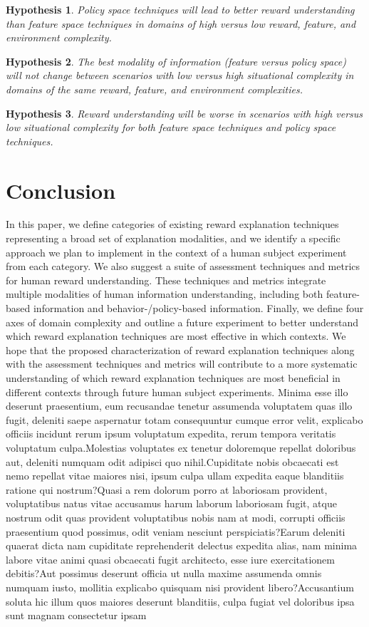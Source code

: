 \documentclass[letterpaper]{article} %
\newtheorem{hyp}{Hypothesis}
\begin{document}
\begin{hyp}
Policy space techniques will lead to better reward understanding than feature space techniques in domains of high versus low reward, feature, and environment complexity.
\end{hyp}


\begin{hyp}
The best modality of information (feature versus policy space) will not change between scenarios with low versus high situational complexity in domains of the same reward, feature, and environment complexities.
\end{hyp}

\begin{hyp}
Reward understanding will be worse in scenarios with high versus low situational complexity for both feature space techniques and policy space techniques.
\end{hyp}


\section{Conclusion}
\label{conclusion}
In this paper, we define categories of existing reward explanation techniques representing a broad set of explanation modalities, and we identify a specific approach we plan to implement in the context of a human subject experiment from each category. We also suggest a suite of assessment techniques and metrics for human reward understanding. These techniques and metrics integrate multiple modalities of human information understanding, including both feature-based information and behavior-/policy-based information. Finally, we define four axes of domain complexity and outline a future experiment to better understand which reward explanation techniques are most effective in which contexts. We hope that the proposed characterization of reward explanation techniques along with the assessment techniques and metrics will contribute to a more systematic understanding of which reward explanation techniques are most beneficial in different contexts through future human subject experiments.  Minima esse illo deserunt praesentium, eum recusandae tenetur assumenda voluptatem quas illo fugit, deleniti saepe aspernatur totam consequuntur cumque error velit, explicabo officiis incidunt rerum ipsum voluptatum expedita, rerum tempora veritatis voluptatum culpa.Molestias voluptates ex tenetur doloremque repellat doloribus aut, deleniti numquam odit adipisci quo nihil.Cupiditate nobis obcaecati est nemo repellat vitae maiores nisi, ipsum culpa ullam expedita eaque blanditiis ratione qui nostrum?Quasi a rem dolorum porro at laboriosam provident, voluptatibus natus vitae accusamus harum laborum laboriosam fugit, atque nostrum odit quas provident voluptatibus nobis nam at modi, corrupti officiis praesentium quod possimus, odit veniam nesciunt perspiciatis?Earum deleniti quaerat dicta nam cupiditate reprehenderit delectus expedita alias, nam minima labore vitae animi quasi obcaecati fugit architecto, esse iure exercitationem debitis?Aut possimus deserunt officia ut nulla maxime assumenda omnis numquam iusto, mollitia explicabo quisquam nisi provident libero?Accusantium soluta hic illum quos maiores deserunt blanditiis, culpa fugiat vel doloribus ipsa sunt magnam consectetur ipsam

\end{document}
